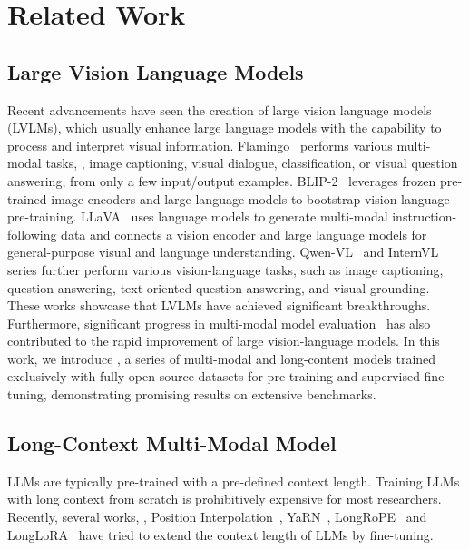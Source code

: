 \section{Related Work}
\label{sec:related_work}







\subsection{Large Vision Language Models}
%
Recent advancements have seen the creation of large vision language models (LVLMs), which usually enhance large language models with the capability to process and interpret visual information.
%
Flamingo~\cite{Flamingo} performs various multi-modal tasks, \eg, image captioning, visual dialogue, classification, or visual question answering, from only a few input/output examples.
%
BLIP-2~\cite{BLIP-2} leverages frozen pre-trained image encoders and large language models to bootstrap vision-language pre-training.
%
LLaVA~\cite{LLaVA} uses language models to generate multi-modal instruction-following data and connects a vision encoder and large language models for general-purpose visual and language understanding.
%
Qwen-VL~\cite{Qwen-VL} and InternVL~\cite{InternVL} series further perform various vision-language tasks, such as image captioning, question answering, text-oriented question answering, and visual grounding.
%
These works showcase that LVLMs have achieved significant breakthroughs.
%
Furthermore, significant progress in multi-modal model evaluation~\cite{MMBench,MME,MMStar} has also contributed to the rapid improvement of large vision-language models.
%
In this work, we introduce \OurMethod, a series of multi-modal and long-content models trained exclusively with fully open-source datasets for pre-training and supervised fine-tuning, demonstrating promising results on extensive benchmarks.
%






\subsection{Long-Context Multi-Modal Model}
%
LLMs are typically pre-trained with a pre-defined context length.
%
Training LLMs with long context from scratch is prohibitively expensive for most researchers.
%
Recently, several works, \eg, Position Interpolation~\cite{PositionInterpolation}, YaRN~\cite{YaRN}, LongRoPE~\cite{LongRoPE} and LongLoRA~\cite{LongLoRA} have tried to extend the context length of LLMs by fine-tuning.
%


